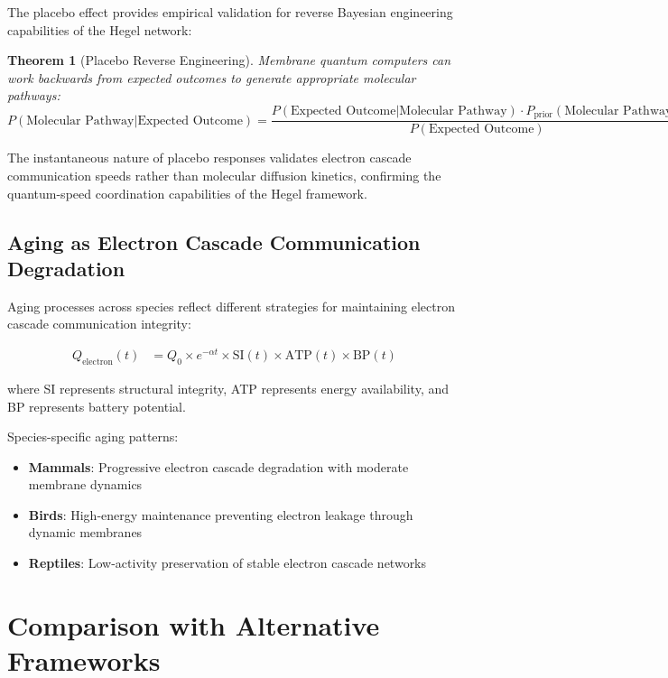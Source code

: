 \documentclass[12pt,a4paper]{article}
\newtheorem{theorem}{Theorem}
\begin{document}
The placebo effect provides empirical validation for reverse Bayesian engineering capabilities of the Hegel network:

\begin{theorem}[Placebo Reverse Engineering]
Membrane quantum computers can work backwards from expected outcomes to generate appropriate molecular pathways:
\begin{equation}
P(\text{Molecular Pathway}|\text{Expected Outcome}) = \frac{P(\text{Expected Outcome}|\text{Molecular Pathway}) \cdot P_{\text{prior}}(\text{Molecular Pathway})}{P(\text{Expected Outcome})}
\end{equation}
\end{theorem}

The instantaneous nature of placebo responses validates electron cascade communication speeds rather than molecular diffusion kinetics, confirming the quantum-speed coordination capabilities of the Hegel framework.

\subsection{Aging as Electron Cascade Communication Degradation}

Aging processes across species reflect different strategies for maintaining electron cascade communication integrity:

\begin{align}
Q_{\text{electron}}(t) &= Q_0 \times e^{-\alpha t} \times \text{SI}(t) \times \text{ATP}(t) \times \text{BP}(t)
\end{align}

where SI represents structural integrity, ATP represents energy availability, and BP represents battery potential.

Species-specific aging patterns:
\begin{itemize}
\item \textbf{Mammals}: Progressive electron cascade degradation with moderate membrane dynamics
\item \textbf{Birds}: High-energy maintenance preventing electron leakage through dynamic membranes
\item \textbf{Reptiles}: Low-activity preservation of stable electron cascade networks
\end{itemize}

\section{Comparison with Alternative Frameworks}
\end{document}
